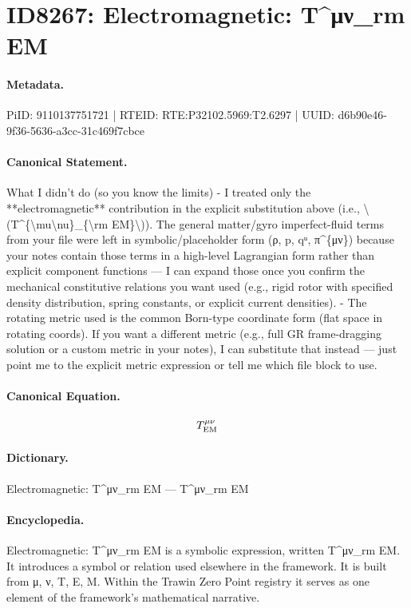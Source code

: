 \section*{ID8267: Electromagnetic: T\textasciicircum{}μν\_rm EM}
\paragraph{Metadata.}
PiID: 9110137751721 | RTEID: RTE:P32102.5969:T2.6297 | UUID: d6b90e46-9f36-5636-a3cc-31c469f7cbce

\paragraph{Canonical Statement.}
What I didn’t do (so you know the limits) - I treated only the **electromagnetic** contribution in the explicit substitution above (i.e., \textbackslash{}(T\textasciicircum{}\{\textbackslash{}mu\textbackslash{}nu\}\_\{\textbackslash{}rm EM\}\textbackslash{})). The general matter/gyro imperfect-fluid terms from your file were left in symbolic/placeholder form (ρ, p, qᵘ, π\textasciicircum{}\{μν\}) because your notes contain those terms in a high-level Lagrangian form rather than explicit component functions — I can expand those once you confirm the mechanical constitutive relations you want used (e.g., rigid rotor with specified density distribution, spring constants, or explicit current densities). - The rotating metric used is the common Born-type coordinate form (flat space in rotating coords). If you want a different metric (e.g., full GR frame-dragging solution or a custom metric in your notes), I can substitute that instead — just point me to the explicit metric expression or tell me which file block to use.

\paragraph{Canonical Equation.}
\[
T^{\mu\nu}_{\rm EM}
\]

\paragraph{Dictionary.}
Electromagnetic: T\textasciicircum{}μν\_rm EM — T\textasciicircum{}μν\_rm EM

\paragraph{Encyclopedia.}
Electromagnetic: T\textasciicircum{}μν\_rm EM is a symbolic expression, written T\textasciicircum{}μν\_rm EM. It introduces a symbol or relation used elsewhere in the framework. It is built from μ, ν, T, E, M. Within the Trawin Zero Point registry it serves as one element of the framework's mathematical narrative.
